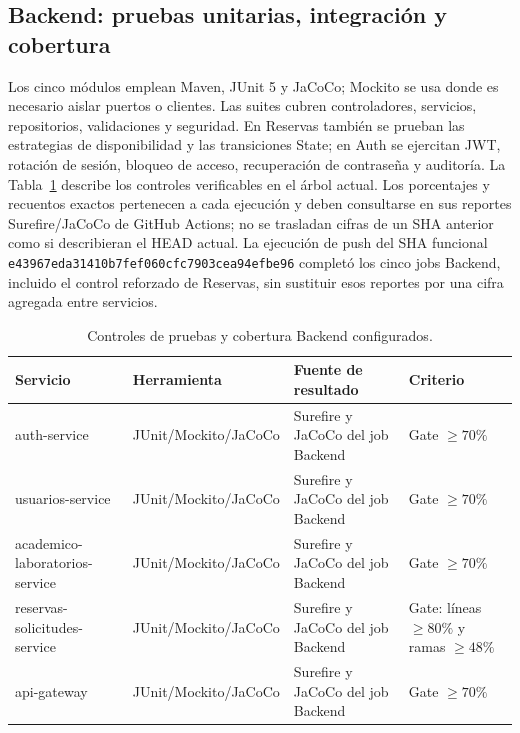 \subsection{Backend: pruebas unitarias, integración y cobertura}
\label{subsec:pruebas-backend}

Los cinco módulos emplean Maven, JUnit 5 y JaCoCo; Mockito se usa donde es
necesario aislar puertos o clientes. Las suites cubren controladores, servicios,
repositorios, validaciones y seguridad. En Reservas también se prueban las
estrategias de disponibilidad y las transiciones State; en Auth se ejercitan JWT,
rotación de sesión, bloqueo de acceso, recuperación de contraseña y auditoría.
La Tabla~\ref{tab:cobertura-backend} describe los controles verificables en el
árbol actual. Los porcentajes y recuentos exactos pertenecen a cada ejecución y
deben consultarse en sus reportes Surefire/JaCoCo de GitHub Actions; no se
trasladan cifras de un SHA anterior como si describieran el HEAD actual.
La ejecución de push del SHA funcional
\texttt{e43967eda31410b7fef060cfc7903cea94efbe96} completó los cinco jobs
Backend, incluido el control reforzado de Reservas, sin sustituir esos reportes
por una cifra agregada entre servicios.

\begin{table}[ht]
  \centering
  \small
  \caption{Controles de pruebas y cobertura Backend configurados.}
  \label{tab:cobertura-backend}
  \begin{tabular}{|p{4.2cm}|p{3.2cm}|p{3.0cm}|p{2.3cm}|}
    \hline
    \textbf{Servicio} & \textbf{Herramienta} & \textbf{Fuente de resultado} & \textbf{Criterio} \\
    \hline
    auth-service & JUnit/Mockito/JaCoCo & Surefire y JaCoCo del job Backend & Gate $\geq 70\%$ \\
    \hline
    usuarios-service & JUnit/Mockito/JaCoCo & Surefire y JaCoCo del job Backend & Gate $\geq 70\%$ \\
    \hline
    academico-laboratorios-service & JUnit/Mockito/JaCoCo & Surefire y JaCoCo del job Backend & Gate $\geq 70\%$ \\
    \hline
    reservas-solicitudes-service & JUnit/Mockito/JaCoCo & Surefire y JaCoCo del job Backend & Gate: líneas $\geq80\%$ y ramas $\geq48\%$ \\
    \hline
    api-gateway & JUnit/Mockito/JaCoCo & Surefire y JaCoCo del job Backend & Gate $\geq 70\%$ \\
    \hline
  \end{tabular}
\end{table}

